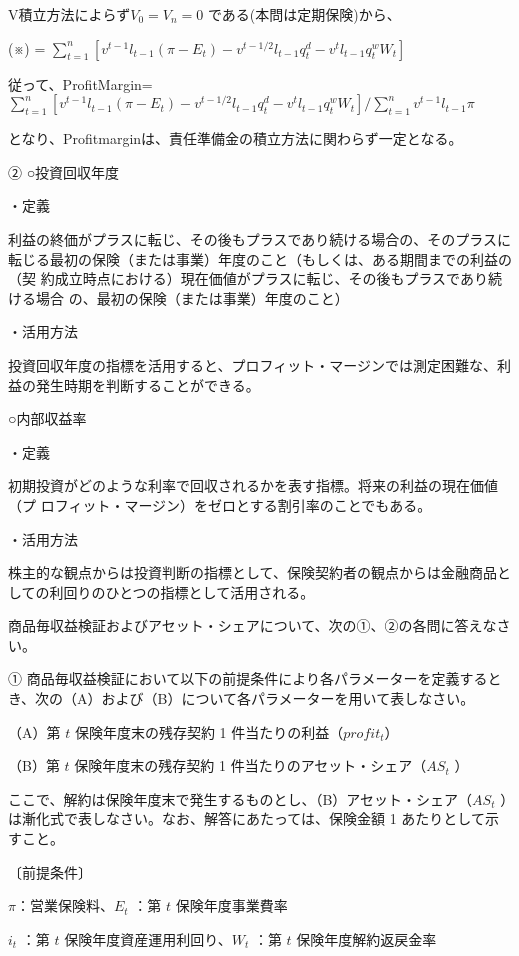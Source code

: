 \documentclass[report,gutter=10mm,fore-edge=10mm,uplatex,dvipdfmx]{jlreq}
\begin{document}
V積立方法によらず$V_0=V_n=0$ である(本問は定期保険)から、

(※) = $ \sum^n_{t=1}[v^{t-1}l_{t-1}(\pi-E_t)-v^{t-1/2}l_{t-1}q_t^d-v^tl_{t-1}q_t^wW_t]$

従って、ProfitMargin= $ \sum^n_{t=1}[v^{t-1}l_{t-1}(\pi-E_t)-v^{t-1/2}l_{t-1}q_t^d-v^tl_{t-1}q_t^wW_t] / \sum^n_{t=1}v^{t-1}l_{t-1}\pi$

となり、Profitmarginは、責任準備金の積立方法に関わらず一定となる。

②
○投資回収年度

・定義

利益の終価がプラスに転じ、その後もプラスであり続ける場合の、そのプラスに
転じる最初の保険（または事業）年度のこと（もしくは、ある期間までの利益の（契
約成立時点における）現在価値がプラスに転じ、その後もプラスであり続ける場合
の、最初の保険（または事業）年度のこと）

・活用方法

投資回収年度の指標を活用すると、プロフィット・マージンでは測定困難な、利
益の発生時期を判断することができる。

○内部収益率

・定義

初期投資がどのような利率で回収されるかを表す指標。将来の利益の現在価値（プ
ロフィット・マージン）をゼロとする割引率のことでもある。

・活用方法

株主的な観点からは投資判断の指標として、保険契約者の観点からは金融商品と
しての利回りのひとつの指標として活用される。


商品毎収益検証およびアセット・シェアについて、次の①、②の各問に答えなさい。

① 商品毎収益検証において以下の前提条件により各パラメーターを定義するとき、次の（A）および（B）について各パラメーターを用いて表しなさい。

（A）第 $t$ 保険年度末の残存契約 1 件当たりの利益（$profit_t$）

（B）第 $t$ 保険年度末の残存契約 1 件当たりのアセット・シェア（$AS_t$ ）

ここで、解約は保険年度末で発生するものとし、（B）アセット・シェア（$AS_t$ ）は漸化式で表しなさい。なお、解答にあたっては、保険金額 1 あたりとして示すこと。

〔前提条件〕

$\pi$：営業保険料、$E_t$ ：第 $t$ 保険年度事業費率

$i_t$ ：第 $t$ 保険年度資産運用利回り、$W_t$ ：第 $t$ 保険年度解約返戻金率
\end{document}
